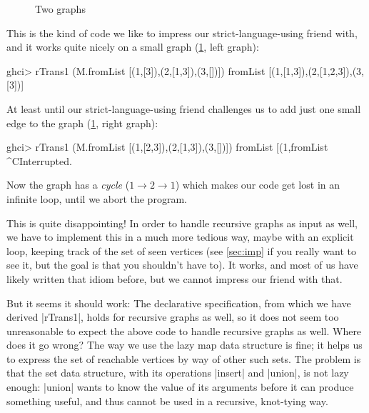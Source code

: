 \documentclass[manuscript,review,screen,acmsmall]{acmart}
\begin{document}
\begin{figure}
\centering
\hfill
\hfill
{}
\hfill
{}
\hfill
\hfill
\strut
\caption{Two graphs}\label{fig:graphs}
\end{figure}

This is the kind of code we like to impress our strict-language-using friend with, and it works quite nicely on a small graph (\cref{fig:graphs}, left graph):
\begin{code}
ghci> rTrans1 (M.fromList [(1,[3]),(2,[1,3]),(3,[])])
fromList [(1,[1,3]),(2,[1,2,3]),(3,[3])]
\end{code}
%
At least until our strict-language-using friend challenges us to add just one small edge to the graph (\cref{fig:graphs}, right graph):
\begin{code}
ghci> rTrans1 (M.fromList [(1,[2,3]),(2,[1,3]),(3,[])])
fromList [(1,fromList ^CInterrupted.
\end{code}
Now the graph has a \emph{cycle} ($1 \to 2 \to 1$) which makes our code get lost in an infinite loop, until we abort the program.

This is quite disappointing! In order to handle recursive graphs as input as well, we have to implement this in a much more tedious way, maybe with an explicit loop, keeping track of the set of seen vertices (see \cref{sec:imp} if you really want to see it, but the goal is that you shouldn’t have to). It works, and most of us have likely written that idiom before, but we cannot impress our friend with that.

But it seems it should work: The declarative specification, from which we have derived |rTrans1|, holds for recursive graphs as well, so it does not seem too unreasonable to expect the above code to handle recursive graphs as well. Where does it go wrong? The way we use the lazy map data structure is fine; it helps us to express the set of reachable vertices by way of other such sets.
The problem is that the set data structure, with its operations |insert| and |union|, is not lazy enough: |union| wants to know the value of its arguments before it can produce something useful, and thus cannot be used in a recursive, knot-tying way.
\end{document}
